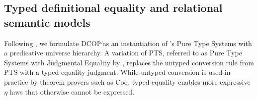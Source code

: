 \documentclass[acmsmall, screen=true, nonacm=true,
  review=\ifpublic false\else true\fi,
  anonymous=\ifanonymous true\else false\fi
]{acmart}
\makeatletter
\DeclarePairedDelimiter{\bracks}{\llbracket}{\rrbracket}
\newcommand{\name}{\texorpdfstring{DCOI$^{\omega}$\@\xspace}{DCOI-omega}}
\newcommand{\interp}[4]{\bracks{#1 \vDash_{#2} #3} \searrow #4}
\newcommand{\member}[3]{#1 \in #3(#2)}
\newcommand{\sws}[3]{#1 \vDash #2 : #3}
\makeatother
\begin{document}


\subsection{Typed definitional equality
  and relational semantic models}

\label{sec:typeddefeq}
Following \citet{liu:dcoi}, we formulate \name as an instantiation of
\citeauthor{barendregt:PTS}'s Pure Type Systems with a predicative
universe hierarchy.
A variation of PTS, referred to as Pure Type Systems with Judgmental
Equality by \citet{adams:pure}, replaces the untyped conversion rule from PTS
with a typed equality judgment. While untyped conversion
is used in practice by theorem provers such as Coq,
typed equality enables more expressive $\eta$ laws
that otherwise cannot be expressed.
\end{document}
